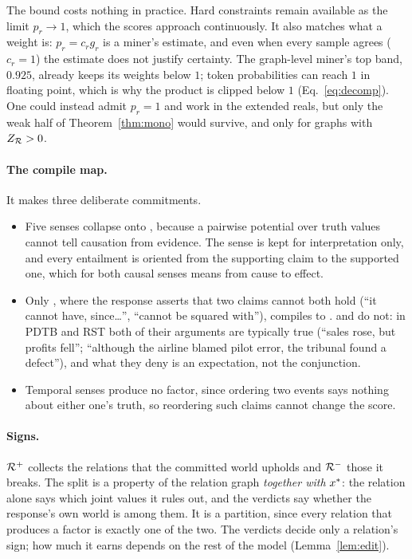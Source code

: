 The bound costs nothing in practice. Hard constraints remain available as the limit $p_r\to1$,
which the scores approach continuously. It also matches what a weight is: $p_r=c_r g_r$ is a
miner's estimate, and even when every sample agrees ($c_r=1$) the estimate does not justify
certainty. The graph-level miner's top band, $0.925$, already keeps its weights below $1$; token
probabilities can reach $1$ in floating point, which is why the product is clipped below $1$
(Eq.~\ref{eq:decomp}). One could instead admit $p_r=1$ and work in the extended reals, but only
the weak half of Theorem~\ref{thm:mono} would survive, and only for graphs with $Z_{\mathcal{R}}>0$.

\paragraph{The compile map.} It makes three deliberate commitments.
\begin{itemize}[leftmargin=1.2em,itemsep=1pt,topsep=2pt]
\item Five senses collapse onto \ent{}, because a pairwise potential over truth values cannot tell
  causation from evidence. The sense is kept for interpretation only, and every entailment is
  oriented from the supporting claim to the supported one, which for both causal senses means from
  cause to effect.
\item Only , where the response asserts that two claims cannot both hold (``it
  cannot have, since\dots'', ``cannot be squared with''), compiles to \con{}.  and
   do not: in PDTB and RST both of their arguments are typically true (``sales
  rose, but profits fell''; ``although the airline blamed pilot error, the tribunal found a
  defect''), and what they deny is an expectation, not the conjunction.
\item Temporal senses produce no factor, since ordering two events says nothing about either
  one's truth, so reordering such claims cannot change the score.
\end{itemize}

\paragraph{Signs.} $\mathcal{R}^{+}$ collects the relations that the committed world upholds and $\mathcal{R}^{-}$
those it breaks. The split is a property of the relation graph \emph{together with} $x^{\ast}$: the
relation alone says which joint values it rules out, and the verdicts say whether the response's
own world is among them. It is a partition, since every relation that produces a factor is exactly
one of the two. The verdicts decide only a relation's sign; how much it earns depends on the rest
of the model (Lemma~\ref{lem:edit}).

